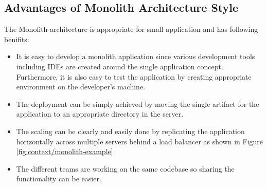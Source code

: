 \subsection{Advantages of Monolith Architecture Style}\label{subsection:context/monolith-advantages}
The Monolith architecture is appropriate for small application and has following benifits:\cite{Richardson:2014ab}\cite{Fowler:2014aa}\cite{Gupta:2015aa}\cite{Abram:2014aa}
\begin{itemize}[leftmargin=.5in]
\item It is easy to develop a monolith application since various development tools including \acrshort{IDE}s are created around the single application concept. Furthermore, it is also easy to test the application by creating appropriate environment on the developer's machine.
\item The deployment can be simply achieved by moving the single artifact for the application to an appropriate directory in the server.
\item The scaling can be clearly and easily done by replicating the application horizontally across multiple servers behind a load balancer as shown in Figure \ref{fig:context/monolith-example}
\item The different teams are working on the same codebase so sharing the functionality can be easier.
\end{itemize}
\\
